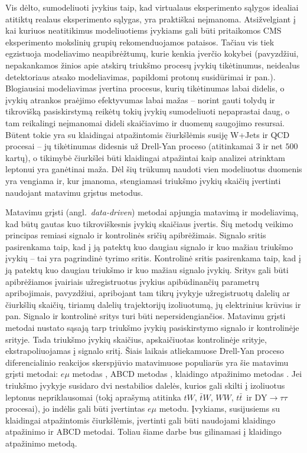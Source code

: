 \documentclass[a4paper, 12pt, oneside]{article}
\newcommand{\tbarW}{\bar{t}W}
\newcommand{\ttbar}{t\bar{t}}
\newcommand{\emu}{e\mu}
\newcommand{\DYtau}{\mathrm{DY} \! \rightarrow \! \tau\tau}
\begin{document}
Vis dėlto, sumodeliuoti įvykius taip, kad virtualaus eksperimento sąlygos idealiai atitiktų realaus eksperimento sąlygas,
yra praktiškai neįmanoma.
Atsižvelgiant į kai kuriuos neatitikimus modeliuotiems įvykiams gali būti pritaikomos CMS eksperimento mokslinių grupių
rekomenduojamos pataisos.
Tačiau vis tiek egzistuoja modeliavimo neapibrėžtumų, kurie kenkia įverčio kokybei (pavyzdžiui, nepakankamos žinios apie
atskirų triukšmo procesų įvykių tikėtinumus, neidealus detektoriaus atsako modeliavimas, papildomi protonų susidūrimai ir pan.).
Blogiausiai modeliavimas įvertina procesus, kurių tikėtinumas labai didelis, o įvykių atrankos praėjimo efektyvumas labai
mažas -- norint gauti tolydų ir tikrovišką pasiskirstymą reikėtų tokių įvykių sumodeliuoti nepaprastai daug, o tam
reikalingi neįmanomai dideli skaičiavimo ir duomenų saugojimo resursai.
Būtent tokie yra su klaidingai atpažintomis čiurkšlėmis susiję W+Jets ir QCD procesai -- jų tikėtinumas didesnis už
Drell-Yan proceso (atitinkamai $3$ ir net $500$ kartų), o tikimybė čiurkšlei būti klaidingai atpažintai kaip analizei
atrinktam leptonui yra ganėtinai maža. 
Dėl šių trūkumų naudoti vien modeliuotus duomenis yra vengiama ir, kur įmanoma, stengiamasi triukšmo įvykių skaičių
įvertinti naudojant matavimu grįstus metodus.

Matavimu grįsti (angl.\ \textit{data-driven}) metodai apjungia matavimą ir modeliavimą, kad būtų gautas kuo
tikroviškesnis įvykių skaičiaus įvertis.
Šių metodų veikimo principas remiasi signalo ir kontrolinės sričių apibrėžimais.
Signalo sritis pasirenkama taip, kad į ją patektų kuo daugiau signalo ir kuo mažiau triukšmo įvykių -- tai yra pagrindinė
tyrimo sritis.
Kontrolinė sritis pasirenkama taip, kad į ją patektų kuo daugiau triukšmo ir kuo mažiau signalo įvykių.
Sritys gali būti apibrėžiamos įvairiais užregistruotus įvykius apibūdinančių parametrų apribojimais, pavyzdžiui,
apribojant tam tikrų įvykyje užregistruotų dalelių ar čiurkšlių skaičių, tiriamų dalelių trajektorijų izoliuotumą, jų
elektrinius krūvius ir pan.
Signalo ir kontrolinė sritys turi būti nepersidengiančios.
Matavimu grįsti metodai nustato sąsają tarp triukšmo įvykių pasiskirstymo signalo ir kontrolinėje srityje.
Tada triukšmo įvykių skaičius, apskaičiuotas kontrolinėje srityje, ekstrapoliuojamas į signalo sritį.
Šiais laikais atliekamuose Drell-Yan proceso diferencialinio reakcijos skerspjūvio matavimuose populiarūs yra šie matavimu
grįsti metodai: $\emu$ metodas \cite{DY_CMS2011, DY_CMS2013, DY_ATLAS2014, DY_CMS2015, DY_CMS2019},
ABCD metodas \cite{DY_CMS2011, DY_CMS2013, DY_ATLAS2014, DY_CMS2015, DY_ATLAS2016, DY_ATLAS2017},
klaidingo atpažinimo metodas \cite{DY_CMS2011, DY_CMS2013, DY_ATLAS2013, DY_CMS2015, DY_ATLAS2016, DY_CMS2019}.
Jei triukšmo įvykyje susidaro dvi nestabilios dalelės, kurios gali skilti į izoliuotus leptonus nepriklausomai
(tokį aprašymą atitinka $tW$, $\tbarW$, $WW$, $\ttbar\,$ ir $\DYtau$ procesai), jo indėlis gali būti įvertintas $\emu$ metodu.
Įvykiams, susijusiems su klaidingai atpažintomis čiurkšlėmis, įvertinti gali būti naudojami klaidingo atpažinimo ir ABCD metodai.
Toliau šiame darbe bus gilinamasi į klaidingo atpažinimo metodą.
\end{document}
